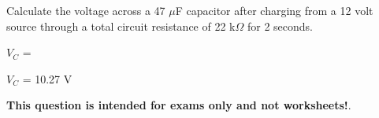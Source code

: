 

Calculate the voltage across a 47 $\mu$F capacitor after charging from a 12 volt source through a total circuit resistance of 22 k$\Omega$ for 2 seconds.

\vskip 10pt

$V_C$ = 







$V_C$ = 10.27 V







{\bf This question is intended for exams only and not worksheets!}.



